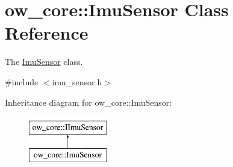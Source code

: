 \hypertarget{classow__core_1_1ImuSensor}{}\section{ow\+\_\+core\+:\+:Imu\+Sensor Class Reference}
\label{classow__core_1_1ImuSensor}


The \hyperlink{classow__core_1_1ImuSensor}{Imu\+Sensor} class.  




{\ttfamily \#include $<$imu\+\_\+sensor.\+h$>$}

Inheritance diagram for ow\+\_\+core\+:\+:Imu\+Sensor\+:\begin{figure}[H]
\begin{center}
\leavevmode
\includegraphics[height=2.000000cm]{d7/d10/classow__core_1_1ImuSensor}
\end{center}
\end{figure}

